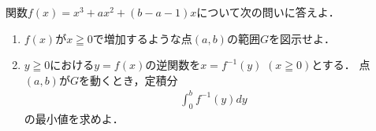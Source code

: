 \documentclass[../../main.tex]{subfiles}
\begin{document}
関数$f(x)=x^3+ax^2+(b-a-1)x$について次の問いに答えよ．
\begin{enumerate}
  \item $f(x)$が$x \geqq 0$で増加するような点$(a,b)$の範囲$G$を図示せよ．
  \item $y \geqq 0$における$y=f(x)$の逆関数を$x=f^{-1}(y)$ $(x \geqq 0)$とする．
    点$(a,b)$が$G$を動くとき，定積分
    \begin{align}
      \int_0^b f^{-1}(y) dy
    \end{align}
    の最小値を求めよ．
\end{enumerate}
\end{document}
